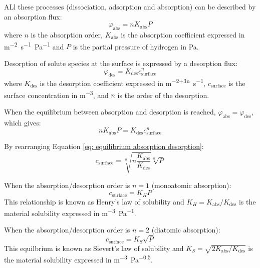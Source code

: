 ALl these processes (dissociation, adsorption and absorption) can be described by an absorption flux:
\begin{equation}
    \varphi_\mathrm{abs} = n K_\mathrm{abs} P
\end{equation}
where $n$ is the absorption order, $K_\mathrm{abs}$ is the absorption coefficient expressed in \si{m^{-2}.s^{-1}.Pa^{-1}} and $P$ is the partial pressure of hydrogen in \si{Pa}.

Desorption of solute species at the surface is expressed by a desorption flux:
\begin{equation}
    \varphi_\mathrm{des} = K_\mathrm{des} c_\mathrm{surface}^n
\end{equation}
where $K_\mathrm{des}$ is the desorption coefficient expressed in \si{m^{-2+3n}.s^{-1}}, $c_\mathrm{surface}$ is the surface concentration in \si{m^{-3}}, and $n$ is the order of the desorption.

When the equilibrium between absorption and desorption is reached, $\varphi_\mathrm{abs} = \varphi_\mathrm{des}$, which gives:
\begin{equation}
    n K_\mathrm{abs} P = K_\mathrm{des} c_\mathrm{surface}^n
    \label{eq: equilibrium absorption desorption}
\end{equation}

By rearranging Equation \ref{eq: equilibrium absorption desorption}:
\begin{equation}
    c_\mathrm{surface} = \sqrt[n]{n \frac{K_\mathrm{abs}}{K_\mathrm{des}}} \sqrt[n]{P}
\end{equation}

When the absorption/desorption order is $n=1$ (monoatomic absorption):
\begin{equation}
    c_\mathrm{surface} = K_H P
\end{equation}
This relationship is known as Henry's law of solubility and $K_H = K_\mathrm{abs}/K_\mathrm{des}$ is the material solubility expressed in \si{m^{-3}.Pa^{-1}}.

When the absorption/desorption order is $n=2$ (diatomic absorption):
\begin{equation}
    c_\mathrm{surface} = K_S \sqrt{P}
\end{equation}
This equilbrium is known as Sievert's law of solubility and $K_S = \sqrt{2 K_\mathrm{abs}/K_\mathrm{des}}$ is the material solubility expressed in \si{m^{-3}.Pa^{-0.5}}.

